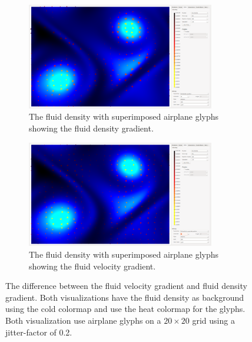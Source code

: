 \begin{figure}[tbh]
	\centering
	\begin{subfigure}{0.45\textwidth}
		\centering
		\includegraphics[width=0.9\textwidth, trim={35px 30px 430px 30px}, clip]{img/gradient/fluid_density_gradient}
		\caption{The fluid density with superimposed airplane glyphs showing the fluid density gradient.}
		\label{fig:gradients:density}
	\end{subfigure}
	\hspace{30px}
	\begin{subfigure}{0.45\textwidth}	
		\centering
		\includegraphics[width=0.9\textwidth, trim={35px 30px 430px 30px}, clip]{img/gradient/fluid_velocity_gradient}
		\caption{The fluid density with superimposed airplane glyphs showing the fluid velocity gradient.}
		\label{fig:gradients:velocity}
	\end{subfigure}
	\caption{The difference between the fluid velocity gradient and fluid density gradient. Both visualizations have the fluid density as background using the cold colormap and use the heat colormap for the glyphs. Both visualization use airplane glyphs on a $20 \times 20$ grid using a jitter-factor of 0.2.}
	\label{fig:gradients}
\end{figure}

